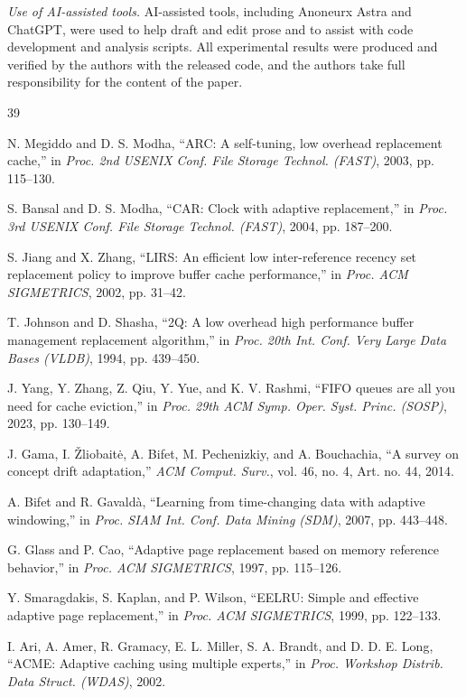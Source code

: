 \documentclass[10pt,twocolumn,a4paper]{IEEEtran}
\begin{document}
\emph{Use of AI-assisted tools.} AI-assisted tools, including Anoneurx Astra
and ChatGPT, were used to help draft and edit prose and to assist with code
development and analysis scripts. All experimental results were produced and
verified by the authors with the released code, and the authors take full
responsibility for the content of the paper.

\begin{thebibliography}{39}

 N. Megiddo and D. S. Modha, ``ARC: A self-tuning, low overhead
replacement cache,'' in \emph{Proc. 2nd USENIX Conf. File Storage Technol.
(FAST)}, 2003, pp. 115--130.

 S. Bansal and D. S. Modha, ``CAR: Clock with adaptive
replacement,'' in \emph{Proc. 3rd USENIX Conf. File Storage Technol. (FAST)},
2004, pp. 187--200.

 S. Jiang and X. Zhang, ``LIRS: An efficient low inter-reference
recency set replacement policy to improve buffer cache performance,'' in
\emph{Proc. ACM SIGMETRICS}, 2002, pp. 31--42.

 T. Johnson and D. Shasha, ``2Q: A low overhead high performance
buffer management replacement algorithm,'' in \emph{Proc. 20th Int. Conf. Very
Large Data Bases (VLDB)}, 1994, pp. 439--450.

 J. Yang, Y. Zhang, Z. Qiu, Y. Yue, and K. V. Rashmi, ``FIFO
queues are all you need for cache eviction,'' in \emph{Proc. 29th ACM Symp.
Oper. Syst. Princ. (SOSP)}, 2023, pp. 130--149.

 J. Gama, I. \v{Z}liobait\.{e}, A. Bifet, M. Pechenizkiy, and A.
Bouchachia, ``A survey on concept drift adaptation,'' \emph{ACM Comput.
Surv.}, vol. 46, no. 4, Art. no. 44, 2014.

 A. Bifet and R. Gavald\`a, ``Learning from time-changing data
with adaptive windowing,'' in \emph{Proc. SIAM Int. Conf. Data Mining (SDM)},
2007, pp. 443--448.

 G. Glass and P. Cao, ``Adaptive page replacement based on memory
reference behavior,'' in \emph{Proc. ACM SIGMETRICS}, 1997, pp. 115--126.

 Y. Smaragdakis, S. Kaplan, and P. Wilson, ``EELRU: Simple and
effective adaptive page replacement,'' in \emph{Proc. ACM SIGMETRICS}, 1999,
pp. 122--133.

 I. Ari, A. Amer, R. Gramacy, E. L. Miller, S. A. Brandt, and D.
D. E. Long, ``ACME: Adaptive caching using multiple experts,'' in \emph{Proc.
Workshop Distrib. Data Struct. (WDAS)}, 2002.


\end{thebibliography}
\end{document}
